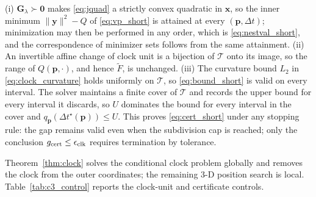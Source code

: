 \documentclass[letterpaper,journal]{IEEEtran}
\newcommand{\bp}{\mathbf{p}}
\newcommand{\bx}{\mathbf{x}}
\newcommand{\by}{\mathbf{y}}
\newcommand{\bG}{\mathbf{G}}
\begin{document}
\begin{IEEEproof}
(i) $\bG_\lambda\succ\mathbf0$ makes \eqref{eq:jquad} a strictly convex
quadratic in $\bx$, so the inner minimum $\|\by\|^2-Q$ of
\eqref{eq:vp_short} is attained at every $(\bp,\Delta t)$; minimization may
then be performed in any order, which is \eqref{eq:nestval_short}, and the
correspondence of minimizer sets follows from the same attainment. (ii) An
invertible affine change of clock unit is a bijection of $\mathcal T$ onto
its image, so the range of $Q(\bp,\cdot)$, and hence
$\widetilde F$, is unchanged. (iii) The curvature bound $L_2$ in
\eqref{eq:clock_curvature} holds uniformly on $\mathcal T$, so
\eqref{eq:bound_short} is valid on every interval. The solver maintains a
finite cover of $\mathcal T$ and records the upper bound for every interval it
discards, so $U$ dominates the bound for every interval in the cover and
$q_{\bp}(\Delta t^\star(\bp))\le U$.
This proves \eqref{eq:cert_short} under any stopping rule: the gap remains
valid even when the subdivision cap is reached; only the conclusion
$g_{\rm cert}\le\epsilon_{\rm clk}$ requires termination by tolerance.
\end{IEEEproof}

Theorem~\ref{thm:clock} solves the conditional clock problem globally and
removes the clock from the outer coordinates; the remaining 3-D position
search is local. Table~\ref{tab:c3_control} reports the clock-unit and
certificate controls.
\end{document}
